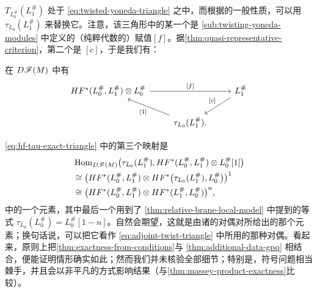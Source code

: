 \noqed
$T_{L^{\#}_0}(L^{\#}_1)$ 处于\trExactTriangle{} \eqref{eq:twisted-yoneda-triangle} 之中，而根据\trExactTriangle{}的一般性质，可以用 $\tau_{L_0}(L^{\#}_1)$ 来替换它。注意，该三角形中的某一个\trMorphism{}是 \cref{sub:twisting-yoneda-modules} 中定义的（纯粹代数的）赋值\trMorphism{}$[f]$。据\cref{thm:quasi-representative-criterion}，第二个\trMorphism{}是 $[c]$，于是我们有：
\begin{corollary}\label{thm:hf-tau-exact-triangle}
在 $D\mathscr{F}(M)$ 中有\trExactTriangle
\begin{equation}\label{eq:hf-tau-exact-triangle}
\begin{tikzcd}
HF^*(L^{\#}_0,L^{\#}_1)\otimes L^{\#}_0 \ar[rr,"{[f]}"] && L^{\#}_1 \ar[dl,"{[c]}"{swap}] \\
& \tau_{L_0}(L^{\#}_1). \ar[ul,"{[1]}"] &
\end{tikzcd}
\end{equation}
\end{corollary}
\noqed
\begin{remark}\label{thm:third-map-dual-evaluation}
\eqref{eq:hf-tau-exact-triangle} 中的第三个映射是
\begin{equation*}
\begin{aligned}
&\operatorname{Hom}_{D\mathscr{F}(M)}\bigl(\tau_{L_0}(L^{\#}_1),HF^*(L^{\#}_0,L^{\#}_1)\otimes L^{\#}_0[1]\bigr)\\
&\cong\bigl(HF^*(L^{\#}_0,L^{\#}_1)\otimes HF^*\bigl(\tau_{L_0}(L^{\#}_1),L^{\#}_0\bigr)\bigr)^{1}\\
&\cong\bigl(HF^*(L^{\#}_0,L^{\#}_1)\otimes HF^*(L^{\#}_1,L^{\#}_0)\bigr)^{n},
\end{aligned}
\end{equation*}
中的一个元素，其中最后一个\trIsomorphism{}用到了 \cref{thm:relative-brane-local-model} 中提到的等式 $\tau_{L_0}(L^{\#}_0)=L^{\#}_0[1-n]$。自然会期望，这就是由诸\trBasis{}的\trPoincare{}对偶对所给出的那个元素；换句话说，可以把它看作 \eqref{eq:adjoint-twist-triangle} 中所用的那种对偶\trEvaluationMap。看起来，原则上把\cref{thm:exactness-from-conditions}与 \cref{thm:additional-data-gpq} 相结合，便能证明情形确实如此；然而我们并未核验全部细节；特别是，符号问题相当棘手，并且会以非平凡的方式影响结果（与\cref{thm:massey-product-exactness}比较）。
\end{remark}
